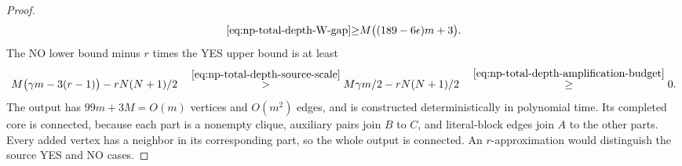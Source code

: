 \begin{proof}
\[\begin{aligned}
{                 \eqref{eq:np-total-depth-W-gap}}{\geq}
 M\bigl((189-6\epsilon)m+3\bigr).
\end{aligned}
\]
The NO lower bound minus $r$ times the YES upper bound is at least
\[
M\bigl(\gamma m-3(r-1)\bigr)-rN(N+1)/2
  \quad\overset{\eqref{eq:np-total-depth-source-scale}}{>}
       M\gamma m/2-rN(N+1)/2
 \quad\overset{\eqref{eq:np-total-depth-amplification-budget}}{\geq}0.
\]
The output has $99m+3M=O(m)$ vertices and $O(m^2)$ edges, and is
constructed deterministically in polynomial time. Its completed core
is connected, because each part is a nonempty clique, auxiliary pairs
join $B$ to $C$, and literal-block edges join $A$ to the other parts.
Every added vertex has a neighbor in its corresponding part, so the
whole output is connected. An $r$-approximation would distinguish the
source YES and NO cases.
\end{proof}

